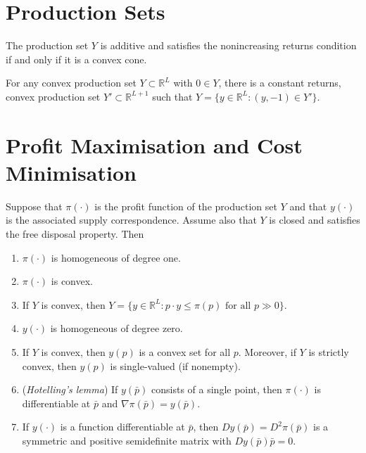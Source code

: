 \addtocounter{section}{1}

\section{Production Sets}

\begin{prop}
    The production set $Y$ is additive and satisfies the nonincreasing returns condition if and only if it is a convex cone.
\end{prop}

\begin{prop}
    For any convex production set $Y \subset \mathbb{R}^L$ with $0 \in Y$, there is a constant returns, convex production set $Y' \subset \mathbb{R}^{L + 1}$ such that $Y = \{y \in \mathbb{R}^L: (y, -1) \in Y'\}$.
\end{prop}


\section{Profit Maximisation and Cost Minimisation}

\begin{prop}
    Suppose that $\pi(\cdot)$ is the profit function of the production set $Y$ and that $y(\cdot)$ is the associated supply correspondence. Assume also that $Y$ is closed and satisfies the free disposal property. Then
    \begin{enumerate}
        \item $\pi(\cdot)$ is homogeneous of degree one.
        \item $\pi(\cdot)$ is convex.
        \item If $Y$ is convex, then $Y = \{y \in \mathbb{R}^L: p \cdot y \leq \pi(p) \text{ for all } p \gg 0\}$.
        \item $y(\cdot)$ is homogeneous of degree zero.
        \item If $Y$ is convex, then $y(p)$ is a convex set for all $p$. Moreover, if $Y$ is strictly convex, then $y(p)$ is single-valued (if nonempty).
        \item (\emph{Hotelling's lemma}) If $y(\bar{p})$ consists of a single point, then $\pi(\cdot)$ is differentiable at $\bar{p}$ and $\nabla \pi(\bar{p}) = y(\bar{p})$.
        \item If $y(\cdot)$ is a function differentiable at $\bar{p}$, then $Dy(\bar{p}) = D^2 \pi(\bar{p})$ is a symmetric and positive semidefinite matrix with $Dy(\bar{p})\bar{p} = 0$.
    \end{enumerate}
\end{prop}

